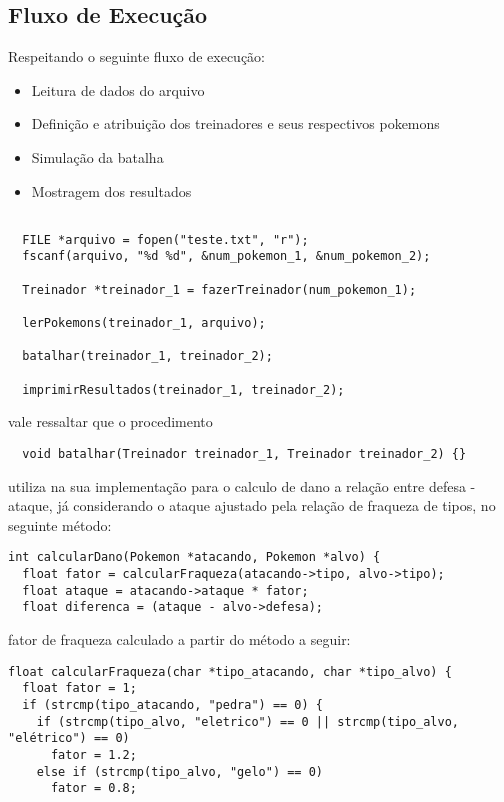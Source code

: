 \documentclass{article}
\begin{document}
\subsection{Fluxo de Execução}
Respeitando o seguinte fluxo de execução:
\begin{itemize}
	\item Leitura de dados do arquivo
	\item Definição e atribuição dos treinadores e seus respectivos pokemons
	\item Simulação da batalha
	\item Mostragem dos resultados
\end{itemize}
\begin{lstlisting}

  FILE *arquivo = fopen("teste.txt", "r");
  fscanf(arquivo, "%d %d", &num_pokemon_1, &num_pokemon_2);

  Treinador *treinador_1 = fazerTreinador(num_pokemon_1);

  lerPokemons(treinador_1, arquivo);

  batalhar(treinador_1, treinador_2);

  imprimirResultados(treinador_1, treinador_2);
\end{lstlisting}
vale ressaltar que o procedimento
\begin{lstlisting}
  void batalhar(Treinador treinador_1, Treinador treinador_2) {}
\end{lstlisting}
utiliza na sua implementação para o calculo de dano a relação entre defesa - ataque, já considerando o ataque ajustado pela relação de fraqueza de tipos, no seguinte método:
\begin{lstlisting}
int calcularDano(Pokemon *atacando, Pokemon *alvo) {
  float fator = calcularFraqueza(atacando->tipo, alvo->tipo);
  float ataque = atacando->ataque * fator;
  float diferenca = (ataque - alvo->defesa);
\end{lstlisting}
fator de fraqueza calculado a partir do método a seguir:
\begin{lstlisting}
float calcularFraqueza(char *tipo_atacando, char *tipo_alvo) {
  float fator = 1;
  if (strcmp(tipo_atacando, "pedra") == 0) {
    if (strcmp(tipo_alvo, "eletrico") == 0 || strcmp(tipo_alvo, "elétrico") == 0)
      fator = 1.2;
    else if (strcmp(tipo_alvo, "gelo") == 0)
      fator = 0.8;
\end{lstlisting}

\pagebreak
\end{document}
